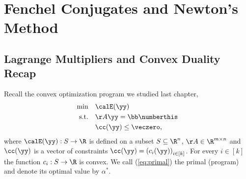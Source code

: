 \chapter{Fenchel Conjugates and Newton's Method}
%
%



%

\sloppy
\section{Lagrange Multipliers and Convex Duality Recap}
Recall the convex optimization program we studied last chapter,
\begin{align*}
  \min\quad & \calE(\yy) \\
  \text{s.t.}\quad  & \AA\yy = \bb \numberthis \label{eq:primal} \\
              & \cc(\yy) \leq \veczero,
\end{align*}
where $\calE(\yy): S \rightarrow \R$ is defined on a subset $S \subseteq \R^n$, $\AA \in \R^{m\times n}$
and $\cc(\yy)$ is a vector of constraints $\cc(\yy) = \left(c_i(\yy)\right)_{i \in [k]}$.
For every $i \in [k]$ the function $c_i: S \rightarrow \R$ is convex. We call (\ref{eq:primal}) the primal (program) and denote its optimal value by $\alpha^*$.

